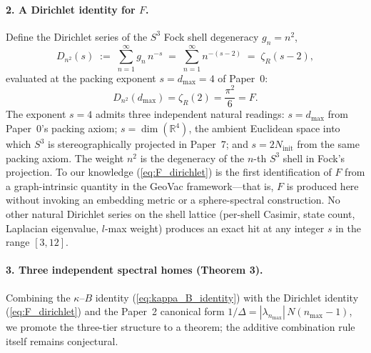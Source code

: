 \documentclass[aps,pra,twocolumn,superscriptaddress,longbibliography]{revtex4-2}
\begin{document}
\paragraph{2. A Dirichlet identity for $F$.}
Define the Dirichlet series of the $S^3$ Fock shell degeneracy
$g_n = n^2$,
\begin{equation}
  D_{n^2}(s) \;:=\; \sum_{n=1}^{\infty} g_n\, n^{-s}
             \;=\; \sum_{n=1}^{\infty} n^{-(s-2)}
             \;=\; \zeta_R(s - 2),
  \label{eq:Dn2_def}
\end{equation}
evaluated at the packing exponent $s = d_{\max} = 4$ of Paper~0:
\begin{equation}
  D_{n^2}(d_{\max}) = \zeta_R(2) = \frac{\pi^2}{6} = F.
  \label{eq:F_dirichlet}
\end{equation}
The exponent $s = 4$ admits three independent natural readings:
$s = d_{\max}$ from Paper~0's packing axiom; $s = \dim(\mathbb{R}^4)$,
the ambient Euclidean space into which $S^3$ is stereographically
projected in Paper~7; and $s = 2 N_{\mathrm{init}}$ from the same
packing axiom.  The weight $n^2$ is the degeneracy of the $n$-th
$S^3$ shell in Fock's projection.  To our knowledge
(\ref{eq:F_dirichlet}) is the first identification of $F$ from a
graph-intrinsic quantity in the GeoVac framework---that is, $F$ is
produced here without invoking an embedding metric or a
sphere-spectral construction.  No other natural Dirichlet series
on the shell lattice (per-shell Casimir, state count, Laplacian
eigenvalue, $l$-max weight) produces an exact hit at any integer
$s$ in the range $[3, 12]$.

\paragraph{3. Three independent spectral homes (Theorem 3).}
Combining the $\kappa$--$B$ identity (\ref{eq:kappa_B_identity})
with the Dirichlet identity (\ref{eq:F_dirichlet}) and the
Paper~2 canonical form
$1/\Delta = |\lambda_{n_{\max}}|\, N(n_{\max}{-}1)$, we promote the
three-tier structure to a theorem; the additive combination rule
itself remains conjectural.
\end{document}
